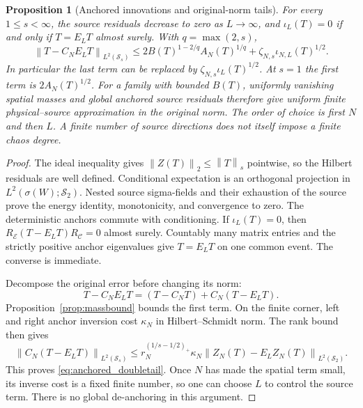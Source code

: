 \documentclass[11pt,a4paper]{amsart}
\numberwithin{equation}{section}
\newtheorem{proposition}[theorem]{Proposition}
\theoremstyle{definition}
\theoremstyle{remark}
\newcommand{\cC}{\mathcal C}
\newcommand{\cE}{\mathcal E}
\newcommand{\Sch}{\mathcal S}
\newcommand{\norm}[1]{\left\lVert#1\right\rVert}
\begin{document}
\begin{proposition}[Anchored innovations and original-norm tails]\label{prop:anchored_source}
For every $1\le s<\infty$, the source residuals decrease to zero as $L\to\infty$, and
$\iota_L(T)=0$ if and only if $T=E_LT$ almost surely. With $q=\max(2,s)$,
\begin{equation}\label{eq:anchored_doubletail}
 \norm{T-C_NE_LT}_{L^2(\Sch_s)}
 \le2B(T)^{1-2/q}A_N(T)^{1/q}
       +\zeta_{N,s}\iota_{N,L}(T)^{1/2}.
\end{equation}
In particular the last term can be replaced by
$\zeta_{N,s}\iota_L(T)^{1/2}$. At $s=1$ the first term is $2A_N(T)^{1/2}$.
For a family with bounded $B(T)$, uniformly vanishing spatial masses and global anchored source residuals therefore give uniform finite physical--source approximation in the original norm. The order of choice is first $N$ and then $L$. A finite number of source directions does not itself impose a finite chaos degree.
\end{proposition}
\begin{proof}
The ideal inequality gives $\norm{Z(T)}_2\le\norm T_s$ pointwise, so the Hilbert residuals are well defined. Conditional expectation is an orthogonal projection in $L^2(\sigma(W);\Sch_2)$. Nested source sigma-fields and their exhaustion of the source prove the energy identity, monotonicity, and convergence to zero. The deterministic anchors commute with conditioning. If $\iota_L(T)=0$, then $R_\cE(T-E_LT)R_\cC=0$ almost surely. Countably many matrix entries and the strictly positive anchor eigenvalues give $T=E_LT$ on one common event. The converse is immediate.

Decompose the original error before changing its norm:
\[
 T-C_NE_LT=(T-C_NT)+C_N(T-E_LT).
\]
Proposition~\ref{prop:massbound} bounds the first term. On the finite corner, left and right anchor inversion cost $\kappa_N$ in Hilbert--Schmidt norm. The rank bound then gives
\[
 \norm{C_N(T-E_LT)}_{L^2(\Sch_s)}
 \le r_N^{(1/s-1/2)_+}\kappa_N
          \norm{Z_N(T)-E_LZ_N(T)}_{L^2(\Sch_2)}.
\]
This proves \eqref{eq:anchored_doubletail}. Once $N$ has made the spatial term small, its inverse cost is a fixed finite number, so one can choose $L$ to control the source term. There is no global de-anchoring in this argument.
\end{proof}
\end{document}
